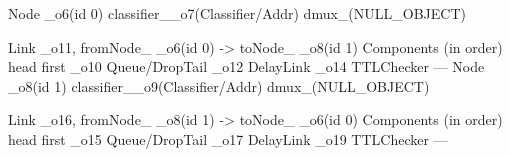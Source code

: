 \documentclass[landscape]{foils}
\begin{document}
\begin{program}
Node _o6(id 0)
                classifier__o7(Classifier/Addr)
                dmux_(NULL_OBJECT)

        Link _o11, fromNode_ _o6(id 0) -> toNode_ _o8(id 1)
        Components (in order) head first
                _o10    Queue/DropTail
                _o12    DelayLink
                _o14    TTLChecker
---
Node _o8(id 1)
                classifier__o9(Classifier/Addr)
                dmux_(NULL_OBJECT)

        Link _o16, fromNode_ _o8(id 1) -> toNode_ _o6(id 0)
        Components (in order) head first
                _o15    Queue/DropTail
                _o17    DelayLink
                _o19    TTLChecker
---
%
\end{program}

\begin{comment}
\item simple topology of two nodes and one link to illustrate
\end{comment}
\end{document}
